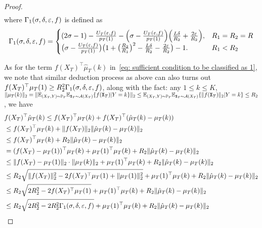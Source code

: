 \begin{proof}
\begin{align}
\end{align}
where $\Gamma_1(\sigma, \delta, \varepsilon, f)$ is defined as
\begin{align*}
    \Gamma_1(\sigma, \delta, \varepsilon, f) = \begin{cases}
    (2\sigma - 1) - \frac{U_T(\varepsilon, f)}{p_T(1)} - \Big(\sigma - \frac{U_T(\varepsilon, f)}{p_T(1)}\Big)\Big(\frac{L\delta}{R_2} + \frac{2\varepsilon}{R_2}\Big), & R_1 = R_2 = R \\
    \big(\sigma - \frac{U_T(\varepsilon, f)}{p_T(1)}\big)\big(1 + \big(\frac{R_2}{R_1}\big)^2 - \frac{L\delta}{R_2} - \frac{2\varepsilon}{R_2}\big) - 1. & R_1 < R_2    
\end{cases}
\end{align*}

As for the term $f(X_T)^\top\hat{\mu}_T(k)$ in~\eqref{eq: sufficient condition to be classified as 1}, we note that similar deduction process as above can also turns out $f(X_T)^{\top}\mu_T(1) \geq R_2^2\Gamma_1(\sigma, \delta, \varepsilon, f)$, along with the fact: any $1 \leq k \leq K$, $\Vert\mu_T(k)\Vert_2 = \Vert\mathbb{E}_{(X_T, Y)\sim \mathbb{P}_T}\mathbb{E}_{\mathtt{X}_T \sim \mathcal{A}(X_T)}\{f(\mathtt{X}_T)\vert Y = k\}\Vert_2 \leq \mathbb{E}_{(X_T, Y)\sim \mathbb{P}_T}\mathbb{E}_{\mathtt{X}_T \sim \mathcal{A}(X_T)}\{\Vert f(\mathtt{X}_T)\Vert_2 \vert Y = k\}\leq R_2$, we have
\begin{align}\label{eq: f(x)μk ≤ Γ}
&f(X_T)^\top\hat{\mu}_T(k) \leq f(X_T)^{\top}\mu_T(k) + f(X_T)^{\top}(\hat{\mu}_T(k) - \mu_T(k)) \nonumber \\
&\leq f(X_T)^{\top}\mu_T(k) + \norm{f(X_T)}_2\norm{\hat{\mu}_T(k) - \mu_T(k)}_2 \nonumber\\
&\leq f(X_T)^{\top}\mu_T(k) + R_2\norm{\hat{\mu}_T(k) - \mu_T(k)}_2 \nonumber \\
&= (f(X_T) - \mu_T(1))^{\top}\mu_T(k) + \mu_T(1)^\top\mu_T(k) + R_2\norm{\hat{\mu}_T(k) - \mu_T(k)}_2 \nonumber\\
&\leq \norm{f(X_T) - \mu_T(1)}_2 \cdot \norm{\mu_T(k)}_2 + \mu_T(1)^\top\mu_T(k) + R_2\norm{\hat{\mu}_T(k) - \mu_T(k)}_2 \nonumber\\
&\leq R_2\sqrt{\norm{f(X_T)}^2_2 - 2f(X_T)^{\top}\mu_T(1) + \norm{\mu_T(1)}_2^2} + \mu_T(1)^\top\mu_T(k) + R_2\norm{\hat{\mu}_T(k) - \mu_T(k)}_2 \nonumber\\
&\leq R_2\sqrt{2R_2^2 - 2f(X_T)^{\top}\mu_T(1)} + \mu_T(1)^\top\mu_T(k) + R_2\norm{\hat{\mu}_T(k) - \mu_T(k)}_2 \nonumber\\
&\leq R_2\sqrt{2R_2^2 - 2R_2^2\Gamma_1(\sigma, \delta, \eps, f)} + \mu_T(1)^\top\mu_T(k) + R_2\norm{\hat{\mu}_T(k) - \mu_T(k)}_2 \nonumber\\

\end{align}
\end{proof}
